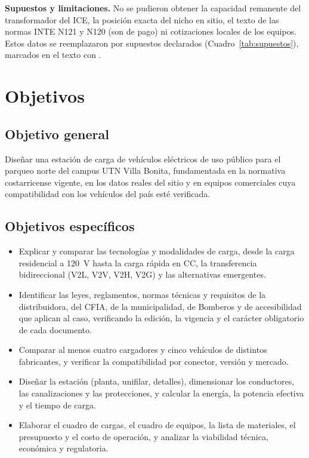 \textbf{Supuestos y limitaciones.} No se pudieron obtener la capacidad remanente del transformador del ICE, la posición exacta del nicho en sitio, el texto de las normas INTE N121 y N120 (son de pago) ni cotizaciones locales de los equipos. Estos datos se reemplazaron por supuestos declarados (Cuadro~\ref{tab:supuestos}), marcados en el texto con \supuesto{}.

\section{Objetivos}
\subsection{Objetivo general}
Diseñar una estación de carga de vehículos eléctricos de uso público para el parqueo norte del campus UTN Villa Bonita, fundamentada en la normativa costarricense vigente, en los datos reales del sitio y en equipos comerciales cuya compatibilidad con los vehículos del país esté verificada.

\subsection{Objetivos específicos}
\begin{itemize}[leftmargin=1.2cm]
\item Explicar y comparar las tecnologías y modalidades de carga, desde la carga residencial a 120~V hasta la carga rápida en CC, la transferencia bidireccional (V2L, V2V, V2H, V2G) y las alternativas emergentes.
\item Identificar las leyes, reglamentos, normas técnicas y requisitos de la distribuidora, del CFIA, de la municipalidad, de Bomberos y de accesibilidad que aplican al caso, verificando la edición, la vigencia y el carácter obligatorio de cada documento.
\item Comparar al menos cuatro cargadores y cinco vehículos de distintos fabricantes, y verificar la compatibilidad por conector, versión y mercado.
\item Diseñar la estación (planta, unifilar, detalles), dimensionar los conductores, las canalizaciones y las protecciones, y calcular la energía, la potencia efectiva y el tiempo de carga.
\item Elaborar el cuadro de cargas, el cuadro de equipos, la lista de materiales, el presupuesto y el costo de operación, y analizar la viabilidad técnica, económica y regulatoria.
\end{itemize}
